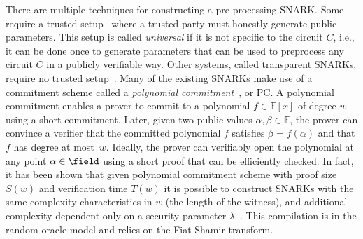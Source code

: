 There are multiple techniques for constructing a pre-processing SNARK.
Some require a trusted setup~\cite{AC:Groth10a,TCC:Lipmaa12,STOC:BCCT13,EC:GGPR13,SP:PHGR13,TCC:BCIOP13,EC:Groth16,C:GroMal17,CCS:MBKM19,EPRINT:GabWilCio19,EC:CHMMVW20} where a trusted party must honestly generate public parameters. This setup is called \emph{universal} if it is not specific to the circuit $C$, i.e., it can be done once to generate parameters that can be used to preprocess any circuit $C$ in a publicly verifiable way. 
Other systems, called transparent SNARKs, require no trusted setup~\cite{C:BBHR19,EC:BunFisSze20,EPRINT:ChiOjhSpo19,EPRINT:BowGriHop19}. 
Many of the existing SNARKs %
make use of a commitment scheme called a {\em polynomial commitment}~\cite{AC:KatZavGol10}, or PC.  A polynomial commitment enables a prover to commit to a polynomial $f \in \mathbb{F}[x]$ of degree $w$ using a short commitment.  Later, given two public values $\alpha, \beta \in \mathbb{F}$, the prover can convince a verifier that the committed polynomial $f$ satisfies $\beta = f(\alpha)$ and that $f$ has degree at most~$w$.  Ideally, the prover can verifiably open the polynomial at any point $\alpha \in \field$ using a short proof that can be efficiently checked. In fact, it has been shown that given polynomial commitment scheme with proof size $S(w)$ and verification time $T(w)$ it is possible to construct SNARKs with the same complexity characteristics in $w$ (the length of the witness), and additional complexity dependent only on a security parameter $\lambda$~\cite{EC:BunFisSze20, EC:CHMMVW20}. This compilation is in the random oracle model and relies on the Fiat-Shamir transform. %


